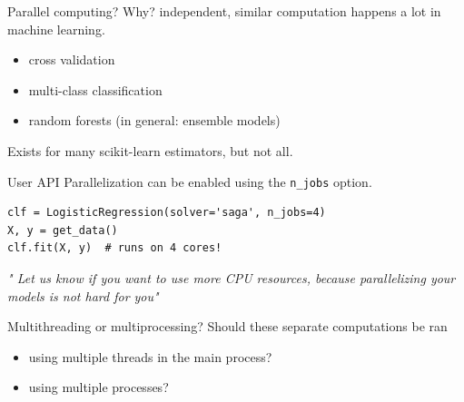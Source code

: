 \documentclass[13pt, usenames,dvipsnames]{beamer} %
\begin{document}
    \begin{frame}[t]{Parallel computing? Why?}
        \small
        \vspace{1cm}
        independent, similar computation happens a lot in machine learning.
        \vspace{1cm}
        \begin{itemize}
            \item cross validation
            \item multi-class classification
            \item random forests \tiny{(in general: ensemble models)}
        \end{itemize}
        \vspace{1cm}
        \begin{flushright}
            \small
        Exists for many scikit-learn estimators, but not all.
        \end{flushright}
    \end{frame}
    \begin{frame}[fragile]{User API}
        \small
        Parallelization can be enabled using the \verb|n_jobs| option.
        \begin{beamerboxesrounded}{}
            \begin{verbatim}
clf = LogisticRegression(solver='saga', n_jobs=4)
X, y = get_data()
clf.fit(X, y)  # runs on 4 cores!
            \end{verbatim}
        \end{beamerboxesrounded}{}
        \textit{" Let us know if you want to use more CPU resources, because
        parallelizing your models is not hard for you"}
    \end{frame}
    \begin{frame}[fragile]{Multithreading or multiprocessing?}
        Should these separate computations be ran 
        \begin{itemize}
            \item using multiple threads in the main process?
            \item using multiple processes?
        \end{itemize}
    \end{frame}
\end{document}
